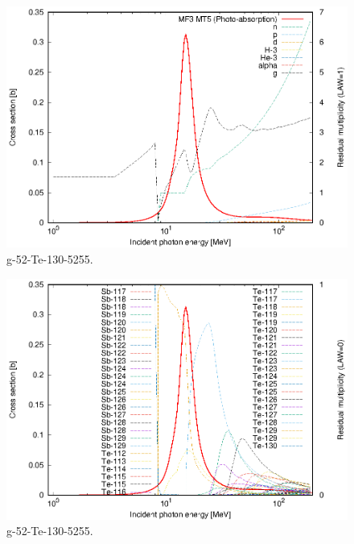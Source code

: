 \begin{figure}
 \includegraphics[width=\linewidth]{eps/g_52-Te-130_5255.eps}
  \caption{g-52-Te-130-5255.}
\end{figure}
\begin{figure}
 \includegraphics[width=\linewidth]{eps-law0/g_52-Te-130_5255.eps}
 \caption{g-52-Te-130-5255.}
\end{figure}
\newpage \clearpage

